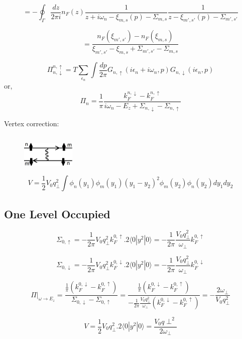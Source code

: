 \[=-\oint_\Gamma \frac{dz}{2\pi i} n_F(z) \frac{1}{z+i\omega_n-\xi_{m,s}(p)-\Sigma_{m,s}} \frac{1}{z-\xi_{m',s'}(p)-\Sigma_{m',s'}}\]

\[=\frac{n_F(\xi_{m',s'})-n_F(\xi_{m,s})}{\xi_{m',s'}-\xi_{m,s}+\Sigma_{m',s'}-\Sigma_{m,s}}\]

\[\Pi_{n,\downarrow}^{n,\uparrow}=T\sum\limits_{\epsilon_n} \int \frac{dp}{2\pi} G_{n,\uparrow}(i\epsilon_n+i\omega_n,p)G_{n,\downarrow}(i\epsilon_n,p)\]
or,
\begin{equation}
	\Pi_n=\frac{1}{\pi} \frac{k_F^{n,\downarrow}-k_F^{n,\uparrow}}{i\omega_n-E_z+\Sigma_{n,\downarrow}-\Sigma_{n,\uparrow}}
\end{equation}

Vertex correction:

\[\]

\begin{figure}[h]
	\centering
	\includegraphics[width=1in]{apfig2}
\end{figure}

\begin{equation}
	V=\frac{1}{2} V_0 q_\perp^2 \int \phi_n(y_1) \phi_m(y_1) (y_1-y_2)^2 \phi_m(y_2) \phi_n(y_2) dy_1 dy_2
\end{equation}

\subsection{One Level Occupied}

\[\Sigma_{0,\uparrow}=-\frac{1}{2\pi} V_0 q_\perp^2 k_F^{0,\uparrow}.2\langle 0|y^2|0\rangle=-\frac{1}{2\pi} \frac{V_0 q_\perp^2}{\omega_{\perp}} k_F^{0,\uparrow}\]

\[\Sigma_{0,\downarrow}=-\frac{1}{2\pi} V_0 q_\perp^2 k_F^{0,\downarrow}.2\langle0|y^2|0\rangle = -\frac{1}{2\pi} \frac{V_0 q_\perp^2}{\omega_{\perp}} k_F^{0,\downarrow}\]


\[\Pi|_{\omega\rightarrow E_z}=\frac{\frac{1}{\pi}(k_F^{0,\downarrow}-k_F^{0,\uparrow})}{\Sigma_{0,\downarrow}-\Sigma_{0,\uparrow}}=\frac{\frac{1}{\pi}(k_F^{0,\downarrow}-k_F^{0,\uparrow})}{-\frac{1}{2\pi} \frac{V_0 q_\perp^2}{\omega_{\perp}}(k_F^{0,\downarrow}-k_F^{0,\uparrow})}=-\frac{2\omega_{\perp}}{V_0 q_\perp^2}\]

\[V=\frac{1}{2} V_0 q_\perp^2. 2\langle 0|y^2|0\rangle = \frac{V_0 q\perp^2}{2\omega_{\perp}} \]

